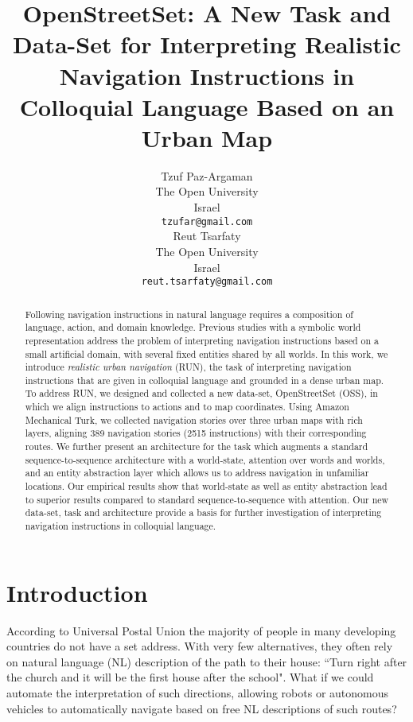 \documentclass[11pt,a4paper]{article}
\title{OpenStreetSet: A New Task and Data-Set for Interpreting Realistic Navigation Instructions in Colloquial Language Based on an Urban Map}
\author{Tzuf Paz-Argaman \\
  The Open University\\
  Israel \\
  {\tt tzufar@gmail.com} \\\And
  Reut Tsarfaty \\
  The Open University\\
  Israel \\
  {\tt reut.tsarfaty@gmail.com} \\}
\date{}
\begin{document}
\maketitle
\begin{abstract}

  Following navigation instructions in natural language requires a composition of language, action, and domain knowledge. Previous studies with a symbolic world representation address the problem of interpreting navigation instructions based on a small artificial domain, with several fixed entities shared by all worlds. In this work, we introduce {\em realistic urban navigation} (RUN), the task of interpreting navigation instructions that are given in colloquial language and grounded in a dense urban map. To address RUN, we designed and collected a new data-set, OpenStreetSet (OSS), in which we align instructions to actions and to map coordinates.  Using Amazon Mechanical Turk, we collected navigation stories over three  urban maps with rich layers, aligning 389 navigation stories (2515  instructions) with their corresponding routes. We further present an architecture for the task which augments a standard sequence-to-sequence architecture with a world-state, attention over words and worlds, and an entity abstraction layer which allows us to address navigation in unfamiliar locations. Our empirical results show that world-state as well as entity abstraction lead to superior results compared to standard sequence-to-sequence with attention. Our new data-set, task and architecture provide a basis for further investigation of interpreting navigation instructions in colloquial language.  
\end{abstract}


\section{Introduction}

According to Universal Postal Union \citep{upupaper} the majority of people in many developing countries do not have a set address. With very few alternatives, they often rely on natural language (NL) description of the path to their house: ``Turn right after the church and it will be the first house after the school". What if we could automate the interpretation of such directions, allowing robots or autonomous vehicles to automatically navigate based on free NL descriptions of such routes?  \par
\end{document}
